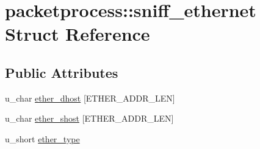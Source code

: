\hypertarget{structpacketprocess_1_1sniff__ethernet}{\section{packetprocess\-:\-:sniff\-\_\-ethernet Struct Reference}
\label{structpacketprocess_1_1sniff__ethernet}
}
\subsection*{Public Attributes}
\begin{DoxyCompactItemize}
\item 
u\-\_\-char \hyperlink{structpacketprocess_1_1sniff__ethernet_a85e01cf751d0684915d6cd4502b476bc}{ether\-\_\-dhost} \mbox{[}E\-T\-H\-E\-R\-\_\-\-A\-D\-D\-R\-\_\-\-L\-E\-N\mbox{]}
\item 
u\-\_\-char \hyperlink{structpacketprocess_1_1sniff__ethernet_a7fd15b2b34d9dfb673740d90ef101dc8}{ether\-\_\-shost} \mbox{[}E\-T\-H\-E\-R\-\_\-\-A\-D\-D\-R\-\_\-\-L\-E\-N\mbox{]}
\item 
u\-\_\-short \hyperlink{structpacketprocess_1_1sniff__ethernet_ac4e709a11c8035f019c15e21dbb8595f}{ether\-\_\-type}
\end{DoxyCompactItemize}


